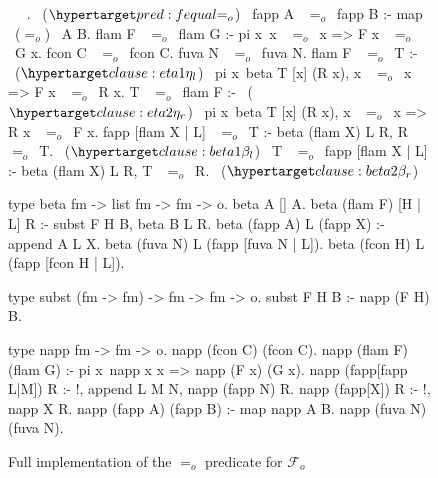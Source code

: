 \documentclass[sigconf,natbib=false]{acmart}
\newcommand{\EqualRel}{\ensuremath{=}}
\newcommand{\Eo}{\ensuremath{\EqualRel_o}\xspace}
\newcommand{\Fo}{\ensuremath{\mathcal{F}_{\!o}\xspace}} %
\begin{document}
\begin{figure}
\begin{elpicode}
~ \PYG{n+nf}{(\Eo)} ~.                           ~($\customlabel{pred:fequal}{\Eo}$)~
fapp A ~\Eo~fapp B :- map ~(\Eo)~ A B.
flam F ~\Eo~flam G :- pi x\ x ~\Eo~x => F x ~\Eo~G x.
fcon C ~\Eo~fcon C.
fuva N ~\Eo~fuva N.
flam F ~\Eo~T :-                                       ~($\customlabel{clause:eta1}{\eta_l}$)~
  pi x\ beta T [x] (R x), x ~\Eo~x => F x ~\Eo~R x.
T ~\Eo~flam F :-                                       ~($\customlabel{clause:eta2}{\eta_r}$)~
  pi x\ beta T [x] (R x), x ~\Eo~x => R x ~\Eo~F x.
fapp [flam X | L] ~\Eo~T :- beta (flam X) L R, R ~\Eo~T. ~($\customlabel{clause:beta1}{\beta_l}$)~
T ~\Eo~fapp [flam X | L] :- beta (flam X) L R, T ~\Eo~R. ~($\customlabel{clause:beta2}{\beta_r}$)~

type beta fm -> list fm -> fm -> o.
beta A [] A.
beta (flam F) [H | L] R :- subst F H B,
  beta B L R. %
beta (fapp A) L (fapp X) :- append A L X.
beta (fuva N) L (fapp [fuva N | L]).
beta (fcon H) L (fapp [fcon H | L]).

type subst (fm -> fm) -> fm -> fm -> o.
subst F H B :- napp (F H) B. %

type napp fm -> fm -> o.
napp (fcon C) (fcon C).
napp (flam F) (flam G) :- pi x\ napp x x => napp (F x) (G x).
napp (fapp[fapp L|M]) R :- !, append L M N, napp (fapp N) R.
napp (fapp[X]) R :- !, napp X R.
napp (fapp A) (fapp B) :- map napp A B.
napp (fuva N) (fuva N).
\end{elpicode}
\caption{Full implementation of the \Eo predicate for \Fo}
\label{code:eo-pred}
\end{figure}
\end{document}
